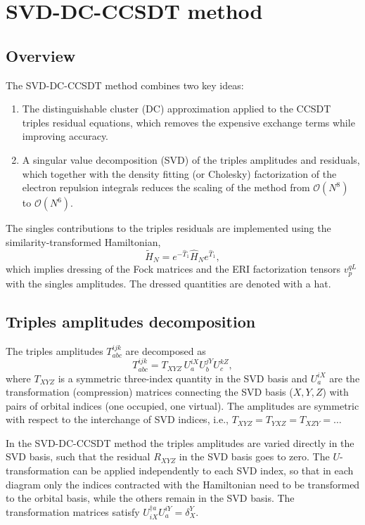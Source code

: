 \documentclass[a4paper,12pt,oneside]{book}
\newcommand{\op}{\hat}
\begin{document}
\section{SVD-DC-CCSDT method}
\subsection{Overview}
The SVD-DC-CCSDT method combines two key ideas:
\begin{enumerate}
\item The distinguishable cluster (DC) approximation applied to the CCSDT triples residual equations,
which removes the expensive exchange terms while improving accuracy.
\item A singular value decomposition (SVD) of the triples amplitudes and residuals, which together 
with the density fitting (or Cholesky) factorization of the electron repulsion integrals 
reduces the scaling of the method from $\mathcal{O}(N^8)$ to $\mathcal{O}(N^6)$.
\end{enumerate}

The singles contributions to the triples residuals are implemented using the similarity-transformed Hamiltonian,
\begin{equation}
\tilde{H}_N = e^{-\op T_1} \op H_N e^{\op T_1},
\end{equation}
which implies dressing of the Fock matrices and the ERI factorization tensors $v_{p}^{qL}$ 
with the singles amplitudes. The dressed quantities are denoted with a hat.

\subsection{Triples amplitudes decomposition}
\label{sec:svd_trip_decomp}

The triples amplitudes $T^{ijk}_{abc}$ are decomposed as
\begin{equation}
  T^{ijk}_{abc} = T_{XYZ} \, U^{iX}_a U^{jY}_b U^{kZ}_c,
  \label{eq:trip_decomp}
\end{equation}
where $T_{XYZ}$ is a symmetric three-index quantity in the SVD basis and 
$U^{iX}_a$ are the transformation (compression) matrices connecting the SVD basis ($X,Y,Z$) 
with pairs of orbital indices (one occupied, one virtual).
The amplitudes are symmetric with respect to the 
interchange of SVD indices, i.e., $T_{XYZ} = T_{YXZ} = T_{XZY} = \ldots$

In the SVD-DC-CCSDT method the triples amplitudes are varied directly in the SVD basis, 
such that the residual $R_{XYZ}$ in the SVD basis goes to zero.
The $U$-transformation can be applied independently to each SVD index, 
so that in each diagram only the indices contracted with the Hamiltonian 
need to be transformed to the orbital basis, while the others remain in the SVD basis. 
The transformation matrices satisfy $U^{\dagger a}_{iX} U^{iY}_a = \delta_X^Y$.
\end{document}
